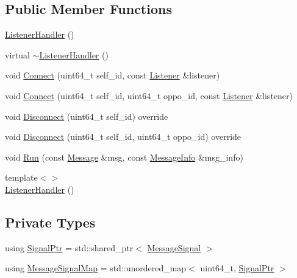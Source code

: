 \subsection*{Public Member Functions}
\begin{DoxyCompactItemize}
\item 
\hyperlink{classapollo_1_1cyber_1_1transport_1_1ListenerHandler_a7030c8148e7194124974615d18b6c713}{Listener\-Handler} ()
\item 
virtual \hyperlink{classapollo_1_1cyber_1_1transport_1_1ListenerHandler_a08c179bc5a9e22cb8a7184e85c9ee43b}{$\sim$\-Listener\-Handler} ()
\item 
void \hyperlink{classapollo_1_1cyber_1_1transport_1_1ListenerHandler_a55db7d72212c0fb491a23cb867183c9c}{Connect} (uint64\-\_\-t self\-\_\-id, const \hyperlink{classapollo_1_1cyber_1_1transport_1_1ListenerHandler_a96764e623a89ce8a872d2e43b6408d98}{Listener} \&listener)
\item 
void \hyperlink{classapollo_1_1cyber_1_1transport_1_1ListenerHandler_a653c56feedf335a9854241425f466b10}{Connect} (uint64\-\_\-t self\-\_\-id, uint64\-\_\-t oppo\-\_\-id, const \hyperlink{classapollo_1_1cyber_1_1transport_1_1ListenerHandler_a96764e623a89ce8a872d2e43b6408d98}{Listener} \&listener)
\item 
void \hyperlink{classapollo_1_1cyber_1_1transport_1_1ListenerHandler_a49732b06a8186e67f648efedca552224}{Disconnect} (uint64\-\_\-t self\-\_\-id) override
\item 
void \hyperlink{classapollo_1_1cyber_1_1transport_1_1ListenerHandler_a5bf12aac3e98dc9b1ba3f33e6170cad8}{Disconnect} (uint64\-\_\-t self\-\_\-id, uint64\-\_\-t oppo\-\_\-id) override
\item 
void \hyperlink{classapollo_1_1cyber_1_1transport_1_1ListenerHandler_a60da04ecf96ee8b5f669e3d598136441}{Run} (const \hyperlink{classapollo_1_1cyber_1_1transport_1_1ListenerHandler_a52a658e4523db4704b6d7e97f326d774}{Message} \&msg, const \hyperlink{classapollo_1_1cyber_1_1transport_1_1MessageInfo}{Message\-Info} \&msg\-\_\-info)
\item 
{\footnotesize template$<$$>$ }\\\hyperlink{classapollo_1_1cyber_1_1transport_1_1ListenerHandler_ab6f903ef1495188f830e7b1bff8f1622}{Listener\-Handler} ()
\end{DoxyCompactItemize}
\subsection*{Private Types}
\begin{DoxyCompactItemize}
\item 
using \hyperlink{classapollo_1_1cyber_1_1transport_1_1ListenerHandler_adbbec4596a920f50c937047a31c7019d}{Signal\-Ptr} = std\-::shared\-\_\-ptr$<$ \hyperlink{classapollo_1_1cyber_1_1transport_1_1ListenerHandler_a9ca5ce35c021aae1145e8e25a5fda0a0}{Message\-Signal} $>$
\item 
using \hyperlink{classapollo_1_1cyber_1_1transport_1_1ListenerHandler_ab534f02021dc0d897b0f1161a604b835}{Message\-Signal\-Map} = std\-::unordered\-\_\-map$<$ uint64\-\_\-t, \hyperlink{classapollo_1_1cyber_1_1transport_1_1ListenerHandler_adbbec4596a920f50c937047a31c7019d}{Signal\-Ptr} $>$
\end{DoxyCompactItemize}
